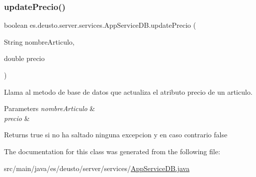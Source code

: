 \subsubsection{\texorpdfstring{updatePrecio()}{updatePrecio()}}
{\footnotesize\ttfamily boolean es.\+deusto.\+server.\+services.\+App\+Service\+D\+B.\+update\+Precio (\begin{DoxyParamCaption}\item[{String}]{nombre\+Articulo,  }\item[{double}]{precio }\end{DoxyParamCaption})}

Llama al metodo de base de datos que actualiza el atributo precio de un articulo. 
\begin{DoxyParams}{Parameters}
{\em nombre\+Articulo} & \\
\hline
{\em precio} & \\
\hline
\end{DoxyParams}
\begin{DoxyReturn}{Returns}
true si no ha saltado ninguna excepcion y en caso contrario false 
\end{DoxyReturn}


The documentation for this class was generated from the following file\+:\begin{DoxyCompactItemize}
\item 
src/main/java/es/deusto/server/services/\mbox{\hyperlink{_app_service_d_b_8java}{App\+Service\+D\+B.\+java}}\end{DoxyCompactItemize}
